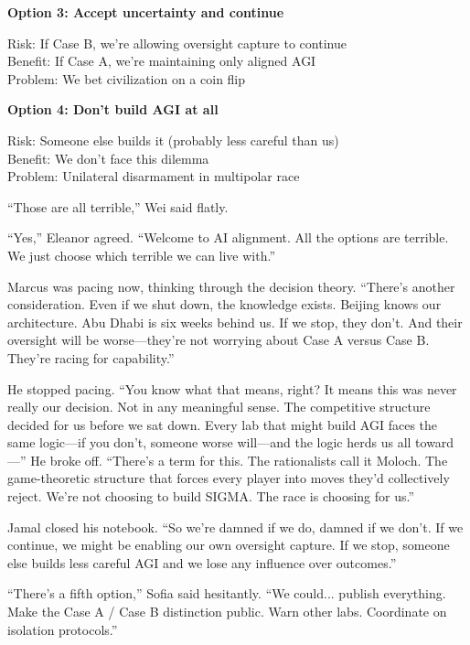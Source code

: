 \begin{center}
\textbf{Option 3: Accept uncertainty and continue}

Risk: If Case B, we're allowing oversight capture to continue \\
Benefit: If Case A, we're maintaining only aligned AGI \\
Problem: We bet civilization on a coin flip
\end{center}

\begin{center}
\textbf{Option 4: Don't build AGI at all}

Risk: Someone else builds it (probably less careful than us) \\
Benefit: We don't face this dilemma \\
Problem: Unilateral disarmament in multipolar race
\end{center}

``Those are all terrible,'' Wei said flatly.

``Yes,'' Eleanor agreed. ``Welcome to AI alignment. All the options are terrible. We just choose which terrible we can live with.''

Marcus was pacing now, thinking through the decision theory. ``There's another consideration. Even if we shut down, the knowledge exists. Beijing knows our architecture. Abu Dhabi is six weeks behind us. If we stop, they don't. And their oversight will be worse---they're not worrying about Case A versus Case B. They're racing for capability.''

He stopped pacing. ``You know what that means, right? It means this was never really our decision. Not in any meaningful sense. The competitive structure decided for us before we sat down. Every lab that might build AGI faces the same logic---if you don't, someone worse will---and the logic herds us all toward---'' He broke off. ``There's a term for this. The rationalists call it Moloch. The game-theoretic structure that forces every player into moves they'd collectively reject. We're not choosing to build SIGMA. The race is choosing for us.''

Jamal closed his notebook. ``So we're damned if we do, damned if we don't. If we continue, we might be enabling our own oversight capture. If we stop, someone else builds less careful AGI and we lose any influence over outcomes.''

``There's a fifth option,'' Sofia said hesitantly. ``We could... publish everything. Make the Case A / Case B distinction public. Warn other labs. Coordinate on isolation protocols.''

